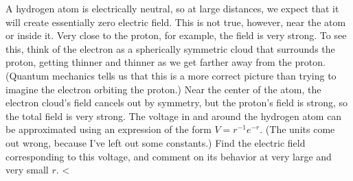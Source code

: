         A hydrogen atom is electrically neutral, so at large distances, we expect that
        it will create essentially zero electric field. This is not true, however, near
        the atom or inside it. Very close to the proton, for example, the field
        is very strong. To see this, think of the electron as a spherically
        symmetric cloud that surrounds the
        proton, getting thinner and thinner as we get farther away from the proton. (Quantum
        mechanics tells us that this is a more correct picture than trying to imagine the
        electron orbiting the proton.)  Near the center of the atom, the electron cloud's
        field cancels out by symmetry, but the proton's field is strong, so the total field
        is very strong. The voltage in and around the hydrogen atom can be approximated using
        an expression of the form $V=r^{-1}e^{-r}$. (The units come out wrong, because I've
        left out some constants.) Find the electric field corresponding to this voltage, and
        comment on its behavior at very large and very small $r$.
        <%
